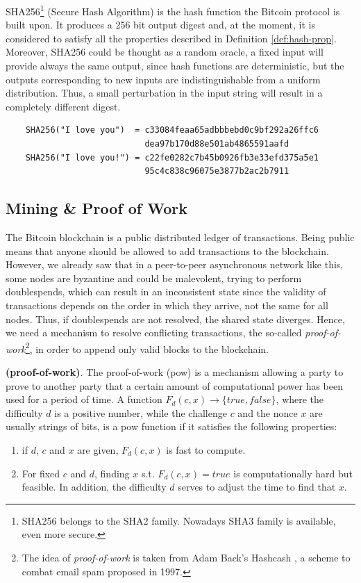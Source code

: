 \begin{myexample}
	SHA256\textup{\footnote{SHA256 belongs to the SHA2 family. Nowadays SHA3 family is available, even more secure.}} (Secure Hash Algorithm) is the hash function the Bitcoin protocol is built upon. It produces a 256 bit output digest and, at the moment, it is considered to satisfy all the properties described in Definition \ref{def:hash-prop}.
	Moreover, SHA256 could be thought as a random oracle, a fixed input will provide always the same output, since hash functions are deterministic, but the outputs corresponding to new inputs are indistinguishable from a uniform distribution. Thus, a small perturbation in the input string will result in a completely different digest.
	\begin{verbatim}
	SHA256("I love you")  = c33084feaa65adbbbebd0c9bf292a26ffc6
	                        dea97b170d88e501ab4865591aafd
	SHA256("I love you!") = c22fe0282c7b45b0926fb3e33efd375a5e1
	                        95c4c838c96075e3877b2ac2b7911
	\end{verbatim}
\end{myexample}

\subsection{Mining \& Proof of Work}
\label{par:pow}
The Bitcoin blockchain is a public distributed ledger of transactions. Being public means that anyone should be allowed to add transactions to the blockchain. However, we already saw that in a peer-to-peer asynchronous network like this, some nodes are byzantine and could be malevolent, trying to perform doublespends, which can result in an inconsistent state since the validity of transactions depends on the order in which they arrive, not the same for all nodes. Thus, if doublespends are not resolved, the shared state diverges. Hence, we need a mechanism to resolve conflicting transactions, the so-called \textit{proof-of-work}\footnote{The idea of \textit{proof-of-work} is taken from Adam Back's Hashcash \cite{Back02hashcash-}, a scheme to combat email spam proposed in 1997.}, in order to append only valid blocks to the blockchain.

\begin{mydef}{\bf (proof-of-work)}.
    \label{def:pow}
    The proof-of-work (pow) is a mechanism allowing a party to prove to another party that a certain amount of computational power has been used for a period of time. A function $F_{d}(c,x) \rightarrow \{true,false\}$, where the difficulty $d$ is a positive number, while the challenge $c$ and the nonce $x$ are usually strings of bits, is a pow function if it satisfies the following properties:
    \begin{enumerate}
        \item if $d$, $c$ and $x$ are given, $F_{d}(c,x)$ is fast to compute.
        \item For fixed $c$ and $d$, finding $x$ s.t. $F_{d}(c,x) = true$ is computationally hard but feasible. In addition, the difficulty $d$ serves to adjust the time to find that $x$.
    \end{enumerate}
\end{mydef}

